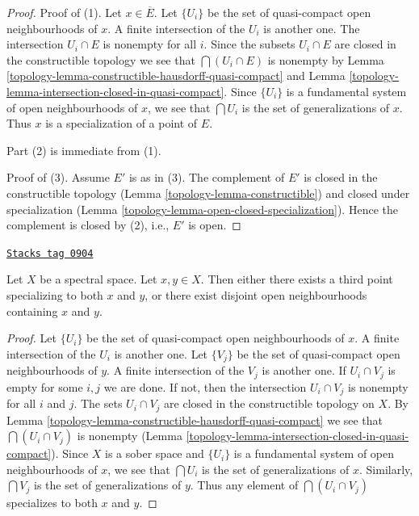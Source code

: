 \begin{proof}

Proof of (1). Let $x \in \overline{E}$. Let $\{U_i\}$ be the set of
quasi-compact open neighbourhoods of $x$. A finite intersection of the
$U_i$ is another one. The intersection $U_i \cap E$ is nonempty for all
$i$. Since the subsets $U_i \cap E$ are closed in the constructible topology
we see that $\bigcap (U_i \cap E)$ is nonempty by
Lemma \ref{topology-lemma-constructible-hausdorff-quasi-compact} and
Lemma \ref{topology-lemma-intersection-closed-in-quasi-compact}.
Since $\{U_i\}$ is a
fundamental system of open neighbourhoods of $x$, we see that
$\bigcap U_i$ is the set of generalizations of $x$. Thus
$x$ is a specialization of a point of $E$.

\medskip\noindent
Part (2) is immediate from (1).

\medskip\noindent
Proof of (3). Assume $E'$ is as in (3). The complement of $E'$ is closed
in the constructible topology (Lemma \ref{topology-lemma-constructible})
and closed under specialization
(Lemma \ref{topology-lemma-open-closed-specialization}).
Hence the complement is closed by (2), i.e., $E'$ is open.
\end{proof}

\begin{lemma}
\label{topology-lemma-two-points}
\href{https://stacks.math.columbia.edu/tag/0904}{\texttt{Stacks tag 0904}}

Let $X$ be a spectral space. Let $x, y \in X$. Then either there exists
a third point specializing to both $x$ and $y$, or there exist disjoint
open neighbourhoods containing $x$ and $y$.
\end{lemma}

\begin{proof}

Let $\{U_i\}$ be the set of quasi-compact open neighbourhoods of $x$.
A finite intersection of the $U_i$ is another one.
Let $\{V_j\}$ be the set of quasi-compact open neighbourhoods of $y$.
A finite intersection of the $V_j$ is another one.
If $U_i \cap V_j$ is empty for some $i, j$ we are done.
If not, then the intersection $U_i \cap V_j$ is nonempty
for all $i$ and $j$. The sets $U_i \cap V_j$ are closed in the constructible
topology on $X$. By
Lemma \ref{topology-lemma-constructible-hausdorff-quasi-compact}
we see that $\bigcap (U_i \cap V_j)$ is nonempty
(Lemma \ref{topology-lemma-intersection-closed-in-quasi-compact}).
Since $X$ is a sober space and $\{U_i\}$ is a
fundamental system of open neighbourhoods of $x$, we see that
$\bigcap U_i$ is the set of generalizations of $x$.
Similarly, $\bigcap V_j$ is the set of generalizations of $y$.
Thus any element of $\bigcap (U_i \cap V_j)$ specializes to both
$x$ and $y$.
\end{proof}

